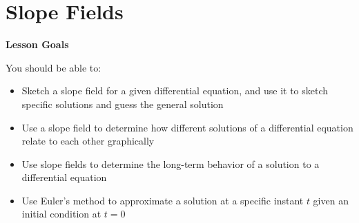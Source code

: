 \documentclass[main]{subfiles}
\begin{document}
\ifSubfilesClassLoaded{%
  \chaptermark{\chapterthree}
}{}

\section{Slope Fields} \label{ws3-2}

\begin{framed}
\centerline{\textbf{Lesson Goals}}

You should be able to:
\begin{itemize}
\item Sketch a slope field for a given differential equation, and use it to sketch specific solutions and guess the general solution
\item Use a slope field to determine how different solutions of a differential equation relate to each other graphically
\item Use slope fields to determine the long-term behavior of a solution to a differential equation
\item Use Euler's method to approximate a solution at a specific instant $t$ given an initial condition at $t=0$
\end{itemize}
\end{framed}
\end{document}
